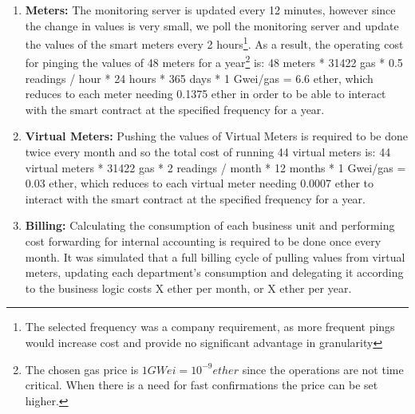 \begin{enumerate}
    \item \textbf{Meters:} The monitoring server is updated every 12 minutes, however since the change in values is very small, we poll the monitoring server and update the values of the smart meters every 2 hours\footnote{The selected frequency was a company requirement, as more frequent pings would increase cost and provide no significant advantage in granularity}. As a result, the operating cost for pinging the values of 48 meters for a year\footnote{The chosen gas price is $1 GWei = 10^{-9} ether$ since the operations are not time critical. When there is a need for fast confirmations the price can be set higher.} is: 48 meters * 31422 gas * 0.5 readings / hour * 24 hours * 365 days * 1 Gwei/gas  = 6.6 ether, which reduces to each meter needing 0.1375 ether in order to be able to interact with the smart contract at the specified frequency for a year. 
    \item \textbf{Virtual Meters:} Pushing the values of Virtual Meters is required to be done twice every month and so the total cost of running 44 virtual meters is: 44 virtual meters * 31422 gas * 2 readings / month * 12 months * 1 Gwei/gas  = 0.03 ether, which reduces to each virtual meter needing 0.0007 ether to interact with the smart contract at the specified frequency for a year. 
    \item \textbf{Billing:} Calculating the consumption of each business unit and performing cost forwarding for internal accounting is required to be done once every month. It was simulated that a full billing cycle of pulling values from virtual meters, updating each department's consumption and delegating it according to the business logic costs X ether per month, or X ether per year.  %
\end{enumerate}
